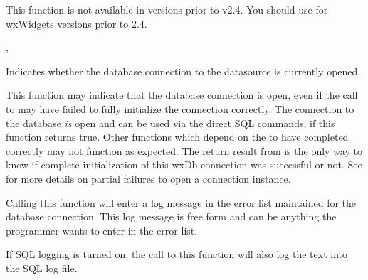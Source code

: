 This function is not available in versions prior to v2.4.  You should
use  for wxWidgets
versions prior to 2.4.


, 

\label{wxdbisopen}


Indicates whether the database connection to the datasource is currently
opened.


This function may indicate that the database connection is open, even if
the call to  may have failed to fully
initialize the connection correctly.  The connection to the database
{\it is} open and can be used via the direct SQL commands, if this
function returns true.  Other functions which depend on the
 to have completed correctly may not function
as expected.  The return result from  is the
only way to know if complete initialization of this wxDb connection was
successful or not.  See  for more details on
partial failures to open a connection instance.

\label{wxdblogerror}




Calling this function will enter a log message in the error list maintained
for the database connection.  This log message is free form and can be
anything the programmer wants to enter in the error list.

If SQL logging is turned on, the call to this function will also log the
text into the SQL log file.



\label{wxdbmodifycolumn}


